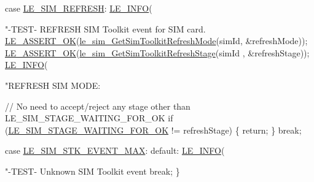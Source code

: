 \begin{DoxyCodeInclude}
{        \textcolor{keywordflow}{case} \hyperlink{le__sim__interface_8h_a7c53ab7f9f004387ef41e80df1121da2a4e4be9cfce6ef2e0832d707820cd106d}{LE\_SIM\_REFRESH}:
            \hyperlink{le__log_8h_a23e6d206faa64f612045d688cdde5808}{LE\_INFO}(\textcolor{stringliteral}{"-TEST- REFRESH SIM Toolkit event for SIM card.%
            \hyperlink{le__log_8h_a7cd2daa3d4af1de4d29e0eed95187484}{LE\_ASSERT\_OK}(\hyperlink{le__sim__interface_8h_a82331254a8f94c20c01a9962a488a29f}{le\_sim\_GetSimToolkitRefreshMode}(simId, 
      &refreshMode));
            \hyperlink{le__log_8h_a7cd2daa3d4af1de4d29e0eed95187484}{LE\_ASSERT\_OK}(\hyperlink{le__sim__interface_8h_a81bd3909308a1456225e59f1f36e73e3}{le\_sim\_GetSimToolkitRefreshStage}(simId
      , &refreshStage));
            \hyperlink{le__log_8h_a23e6d206faa64f612045d688cdde5808}{LE\_INFO}(\textcolor{stringliteral}{"REFRESH SIM MODE: %

            \textcolor{comment}{// No need to accept/reject any stage other than LE\_SIM\_STAGE\_WAITING\_FOR\_OK}
            \textcolor{keywordflow}{if} (\hyperlink{le__sim__interface_8h_a99369a750db46ea1a5acb8cde0eef690a8d38c80c4a899969e6e8e5147bc9bad1}{LE\_SIM\_STAGE\_WAITING\_FOR\_OK} != refreshStage)
            \{
                \textcolor{keywordflow}{return};
            \}
            \textcolor{keywordflow}{break};

        \textcolor{keywordflow}{case} \hyperlink{le__sim__interface_8h_a7c53ab7f9f004387ef41e80df1121da2aa086ea0a94ca7065b6baf974e11ed707}{LE\_SIM\_STK\_EVENT\_MAX}:
        \textcolor{keywordflow}{default}:
            \hyperlink{le__log_8h_a23e6d206faa64f612045d688cdde5808}{LE\_INFO}(\textcolor{stringliteral}{"-TEST- Unknown SIM Toolkit event %
            \textcolor{keywordflow}{break};
    \}

}}}}
\end{DoxyCodeInclude}
